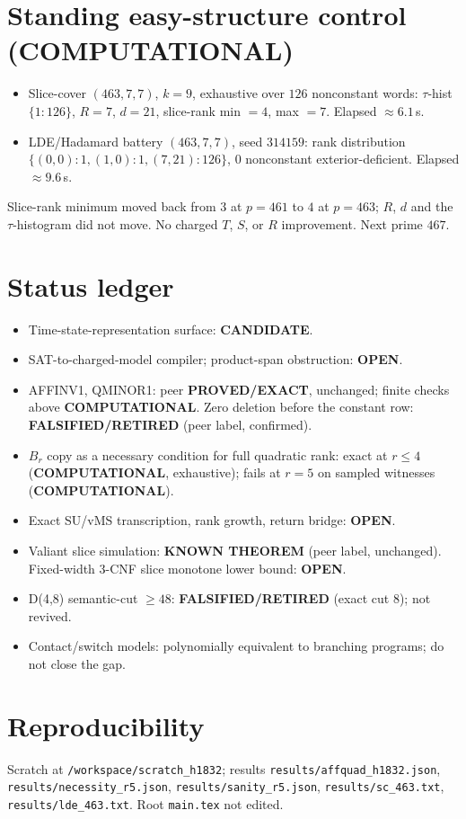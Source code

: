 \documentclass[11pt]{article}
\begin{document}
\section*{Standing easy-structure control (COMPUTATIONAL)}
\begin{itemize}
\item Slice-cover $(463,7,7)$, $k=9$, exhaustive over $126$ nonconstant words: $\tau$-hist $\{1{:}126\}$, $R=7$, $d=21$, slice-rank min $=4$, max $=7$. Elapsed $\approx6.1$\,s.
\item LDE/Hadamard battery $(463,7,7)$, seed $314159$: rank distribution $\{(0,0){:}1,(1,0){:}1,(7,21){:}126\}$, $0$ nonconstant exterior-deficient. Elapsed $\approx9.6$\,s.
\end{itemize}
Slice-rank minimum moved back from $3$ at $p=461$ to $4$ at $p=463$; $R$, $d$ and the $\tau$-histogram did not move. No charged $T$, $S$, or $R$ improvement. Next prime $467$.

\section*{Status ledger}
\begin{itemize}
\item Time-state-representation surface: \textbf{CANDIDATE}.
\item SAT-to-charged-model compiler; product-span obstruction: \textbf{OPEN}.
\item AFFINV1, QMINOR1: peer \textbf{PROVED/EXACT}, unchanged; finite checks above \textbf{COMPUTATIONAL}. Zero deletion before the constant row: \textbf{FALSIFIED/RETIRED} (peer label, confirmed).
\item $B_r$ copy as a necessary condition for full quadratic rank: exact at $r\le4$ (\textbf{COMPUTATIONAL}, exhaustive); fails at $r=5$ on sampled witnesses (\textbf{COMPUTATIONAL}).
\item Exact SU/vMS transcription, rank growth, return bridge: \textbf{OPEN}.
\item Valiant slice simulation: \textbf{KNOWN THEOREM} (peer label, unchanged). Fixed-width 3-CNF slice monotone lower bound: \textbf{OPEN}.
\item D(4,8) semantic-cut $\ge48$: \textbf{FALSIFIED/RETIRED} (exact cut 8); not revived.
\item Contact/switch models: polynomially equivalent to branching programs; do not close the gap.
\end{itemize}

\section*{Reproducibility}
Scratch at \texttt{/workspace/scratch\_h1832}; results \texttt{results/affquad\_h1832.json}, \texttt{results/necessity\_r5.json}, \texttt{results/sanity\_r5.json}, \texttt{results/sc\_463.txt}, \texttt{results/lde\_463.txt}. Root \texttt{main.tex} not edited.
\end{document}
